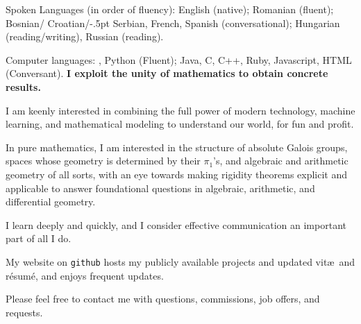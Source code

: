 Spoken Languages (in order of fluency): English (native); Romanian (fluent); Bosnian\kern-1pt/\kern-1pt Croatian\kern-1pt/\kern-.5pt Serbian, French, Spanish (conversational); Hungarian (reading/writing), Russian (reading).

Computer languages: \pLaTeX, Python (Fluent); Java, C, C++, Ruby, Javascript, HTML (Conversant).
{\bf I exploit the unity of mathematics to obtain concrete results.}

I am keenly interested in combining the full power of modern technology, machine learning, and mathematical modeling to understand our world, for fun and profit.

In pure mathematics, I am interested in the structure of absolute Galois groups, spaces whose geometry is determined by their $\pi_1$'s, and algebraic and arithmetic geometry of all sorts, with an eye towards making rigidity theorems explicit and applicable to answer foundational questions in algebraic, arithmetic, and differential geometry.

I learn deeply and quickly, and I consider effective communication an important part of all I do.

My website on {\tt github} hosts my publicly available projects and updated vit\ae\ and r\'esum\'e, and enjoys frequent updates.

Please feel free to contact me with questions, commissions, job offers, and requests.